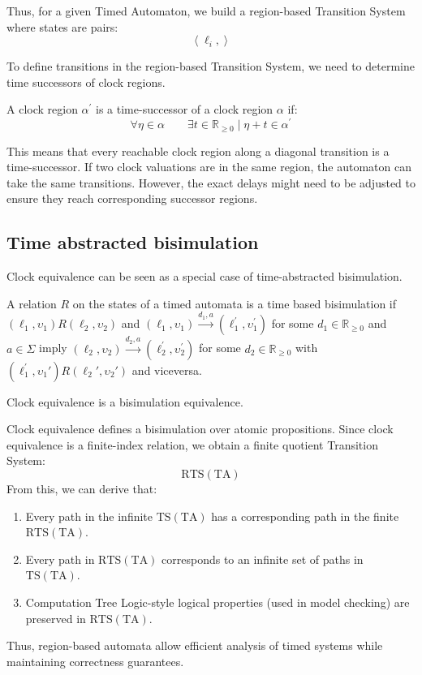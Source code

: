 Thus, for a given Timed Automaton, we build a region-based Transition System where states are pairs:
\[\left\langle \ell_i,\right\rangle\]

To define transitions in the region-based Transition System, we need to determine time successors of clock regions.
\begin{definition}
    A clock region $\alpha^\prime$ is a time-successor of a clock region $\alpha$ if:
    \[\forall\eta\in\alpha\qquad \exists t\in\mathbb{R}_{\geq 0}\mid \eta+t\in\alpha^\prime\]
\end{definition}
\noindent This means that every reachable clock region along a diagonal transition is a time-successor.
If two clock valuations are in the same region, the automaton can take the same transitions.
However, the exact delays might need to be adjusted to ensure they reach corresponding successor regions.

\subsection{Time abstracted bisimulation}
Clock equivalence can be seen as a special case of time-abstracted bisimulation.
\begin{definition}
    A relation $R$ on the states of a timed automata is a time based bisimulation if $(\ell_1,\upsilon_1)R(\ell_2,\upsilon_2)$ and $(\ell_1,\upsilon_1)\xrightarrow{d_1,a}(\ell_1^\prime,\upsilon_1^\prime)$ for some $d_1 \in\mathbb{R}_{\geq 0}$ and $a\in\Sigma$ imply $(\ell_2,\upsilon_2)\xrightarrow{d_2,a}(\ell_2^\prime,\upsilon_2^\prime)$ for some $d_2 \in\mathbb{R}_{\geq 0}$ with $(\ell_1^\prime,\upsilon_1\prime)R(\ell_2\prime,\upsilon_2\prime)$ and viceversa. 
\end{definition}
\begin{theorem}
    Clock equivalence is a bisimulation equivalence.
\end{theorem}
\noindent Clock equivalence defines a bisimulation over atomic propositions. 
Since clock equivalence is a finite-index relation, we obtain a finite quotient Transition System:
\[\text{RTS}(\text{TA})\] 
\noindent From this, we can derive that: 
\begin{enumerate}
    \item Every path in the infinite $\text{TS}(\text{TA})$ has a corresponding path in the finite $\text{RTS}(\text{TA})$.
    \item Every path in $\text{RTS}(\text{TA})$ corresponds to an infinite set of paths in $\text{TS}(\text{TA})$.
    \item Computation Tree Logic-style logical properties (used in model checking) are preserved in $\text{RTS}(\text{TA})$.
\end{enumerate}
\noindent Thus, region-based automata allow efficient analysis of timed systems while maintaining correctness guarantees.